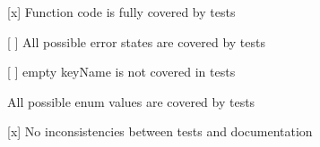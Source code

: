 \begin{DoxyItemize}
\item \mbox{[}x\mbox{]} Function code is fully covered by tests
\item \mbox{[} \mbox{]} All possible error states are covered by tests
\begin{DoxyItemize}
\item \mbox{[} \mbox{]} empty key\+Name is not covered in tests
\end{DoxyItemize}
\item All possible enum values are covered by tests
\item \mbox{[}x\mbox{]} No inconsistencies between tests and documentation
\end{DoxyItemize}
